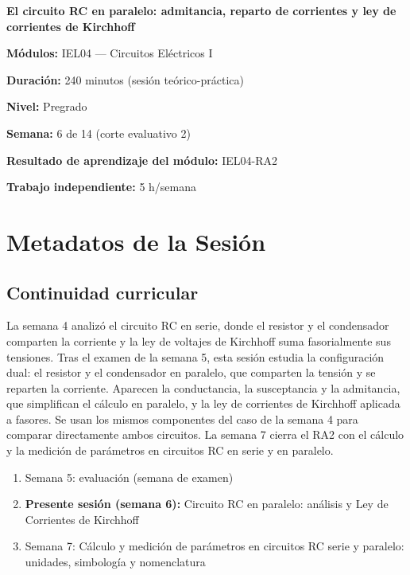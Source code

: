 \documentclass[11pt,letterpaper]{article}
\begin{document}
\begin{cabecera}
{\color{iubyellow}\Large\bfseries El circuito RC en paralelo: admitancia, reparto de corrientes y ley de corrientes de Kirchhoff\par}
\vspace{0.6em}
\small
\textbf{\color{iubyellow}Módulos:} IEL04 --- Circuitos Eléctricos I\par
\textbf{\color{iubyellow}Duración:} 240 minutos (sesión teórico-práctica)\par
\textbf{\color{iubyellow}Nivel:} Pregrado\par
\textbf{\color{iubyellow}Semana:} 6 de 14 (corte evaluativo 2)\par
\textbf{\color{iubyellow}Resultado de aprendizaje del módulo:} IEL04-RA2\par
\textbf{\color{iubyellow}Trabajo independiente:} 5 h/semana\par
\end{cabecera}

\section{Metadatos de la Sesión}

\subsection{Continuidad curricular}

La semana 4 analizó el circuito RC en serie, donde el resistor y el condensador comparten la corriente y la ley de voltajes de Kirchhoff suma fasorialmente sus tensiones. Tras el examen de la semana 5, esta sesión estudia la configuración dual: el resistor y el condensador en paralelo, que comparten la tensión y se reparten la corriente. Aparecen la conductancia, la susceptancia y la admitancia, que simplifican el cálculo en paralelo, y la ley de corrientes de Kirchhoff aplicada a fasores. Se usan los mismos componentes del caso de la semana 4 para comparar directamente ambos circuitos. La semana 7 cierra el RA2 con el cálculo y la medición de parámetros en circuitos RC en serie y en paralelo.

\begin{enumerate}
  \item Semana 5: evaluación (semana de examen)
  \item \textbf{Presente sesión (semana 6):} Circuito RC en paralelo: análisis y Ley de Corrientes de Kirchhoff
  \item Semana 7: Cálculo y medición de parámetros en circuitos RC serie y paralelo: unidades, simbología y nomenclatura
\end{enumerate}
\end{document}
